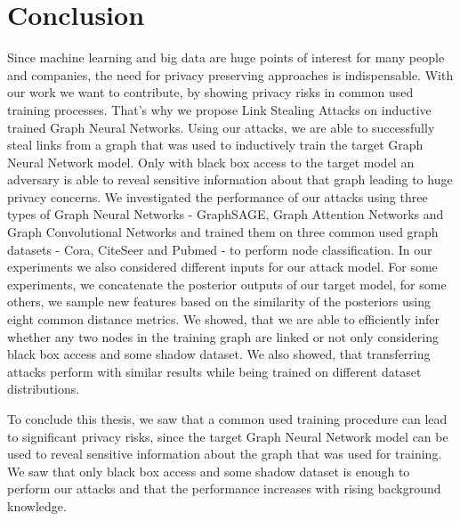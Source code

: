 \chapter{Conclusion}
    Since machine learning and big data are huge points of interest for many people and companies, the need for privacy preserving approaches is indispensable.
    With our work we want to contribute, by showing privacy risks in common used training processes.
    That's why we propose Link Stealing Attacks on inductive trained Graph Neural Networks.
    Using our attacks, we are able to successfully steal links from a graph that was used to inductively train the target Graph Neural Network model.
    Only with black box access to the target model an adversary is able to reveal sensitive information about that graph leading to huge privacy concerns.
    We investigated the performance of our attacks using three types of Graph Neural Networks - GraphSAGE, Graph Attention Networks and Graph Convolutional Networks and trained them on three common used graph datasets - Cora, CiteSeer and Pubmed - to perform node classification.
    In our experiments we also considered different inputs for our attack model.
    For some experiments, we concatenate the posterior outputs of our target model, for some others, we sample new features based on the similarity of the posteriors using eight common distance metrics.   
    We showed, that we are able to efficiently infer whether any two nodes in the training graph are linked or not only considering black box access and some shadow dataset.
    We also showed, that transferring attacks perform with similar results while being trained on different dataset distributions.

    To conclude this thesis, we saw that a common used training procedure can lead to significant privacy risks, since the target Graph Neural Network model can be used to reveal sensitive information about the graph that was used for training.
    We saw that only black box access and some shadow dataset is enough to perform our attacks and that the performance increases with rising background knowledge.
